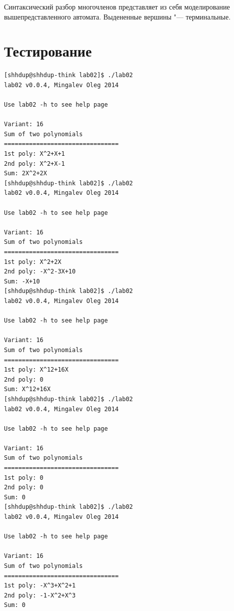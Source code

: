 \documentclass{report}
\begin{document}
Синтаксический разбор многочленов представляет из себя моделирование вышепредставленного автомата. Выдененные вершины "--- терминальные.

\chapter{Тестирование}
\begin{Verbatim}[frame=single,baselinestretch=0.5]
[shhdup@shhdup-think lab02]$ ./lab02 
lab02 v0.0.4, Mingalev Oleg 2014

Use lab02 -h to see help page

Variant: 16
Sum of two polynomials
================================
1st poly: X^2+X+1
2nd poly: X^2+X-1
Sum: 2X^2+2X
[shhdup@shhdup-think lab02]$ ./lab02 
lab02 v0.0.4, Mingalev Oleg 2014

Use lab02 -h to see help page

Variant: 16
Sum of two polynomials
================================
1st poly: X^2+2X
2nd poly: -X^2-3X+10
Sum: -X+10
[shhdup@shhdup-think lab02]$ ./lab02 
lab02 v0.0.4, Mingalev Oleg 2014

Use lab02 -h to see help page

Variant: 16
Sum of two polynomials
================================
1st poly: X^12+16X 
2nd poly: 0
Sum: X^12+16X
[shhdup@shhdup-think lab02]$ ./lab02 
lab02 v0.0.4, Mingalev Oleg 2014

Use lab02 -h to see help page

Variant: 16
Sum of two polynomials
================================
1st poly: 0
2nd poly: 0
Sum: 0
[shhdup@shhdup-think lab02]$ ./lab02 
lab02 v0.0.4, Mingalev Oleg 2014

Use lab02 -h to see help page

Variant: 16
Sum of two polynomials
================================
1st poly: -X^3+X^2+1
2nd poly: -1-X^2+X^3
Sum: 0
\end{Verbatim}

\newpage
\end{document}
